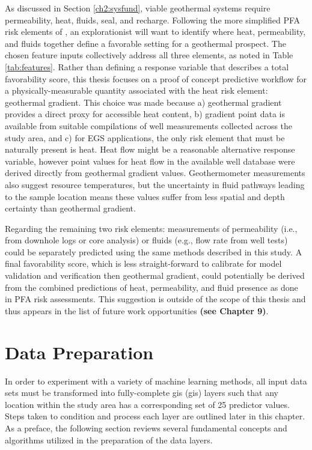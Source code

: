 As discussed in Section \ref{ch2:sysfund}, viable geothermal systems require permeability, heat, fluids, seal, and recharge. Following the more simplified PFA risk elements of \citet{bielicki_hydrogeolgic_2015}, an explorationist will want to identify where heat, permeability, and fluids together define a favorable setting for a geothermal prospect. The chosen feature inputs collectively address all three elements, as noted in Table \ref{tab:features}. Rather than defining a response variable that describes a total favorability score, this thesis focuses on a proof of concept predictive workflow for a physically-measurable quantity associated with the heat risk element: geothermal gradient. This choice was made because a) geothermal gradient provides a direct proxy for accessible heat content, b) gradient point data is available from suitable compilations of well measurements collected across the study area, and c) for EGS applications, the only risk element that must be naturally present is heat. Heat flow might be a reasonable alternative response variable, however point values for heat flow in the available well database were derived directly from geothermal gradient values. Geothermometer measurements also suggest resource temperatures, but the uncertainty in fluid pathways leading to the sample location means these values suffer from less spatial and depth certainty than geothermal gradient.

Regarding the remaining two risk elements: measurements of permeability (i.e., from downhole logs or core analysis) or fluids (e.g., flow rate from well tests) could be separately predicted using the same methods described in this study. A final favorability score, which is less straight-forward to calibrate for model validation and verification then geothermal gradient, could potentially be derived from the combined predictions of heat, permeability, and fluid presence as done in PFA risk assessments. This suggestion is outside of the scope of this thesis and thus appears in the list of future work opportunities \textbf{(see Chapter 9)}.

\section{Data Preparation}

In order to experiment with a variety of machine learning methods, all input data sets must be transformed into fully-complete \acrlong{gis} (\acrshort{gis}) layers such that any location within the study area has a corresponding set of 25 predictor values. Steps taken to condition and process each layer are outlined later in this chapter. As a preface, the following section reviews several fundamental concepts and algorithms utilized in the preparation of the data layers.

